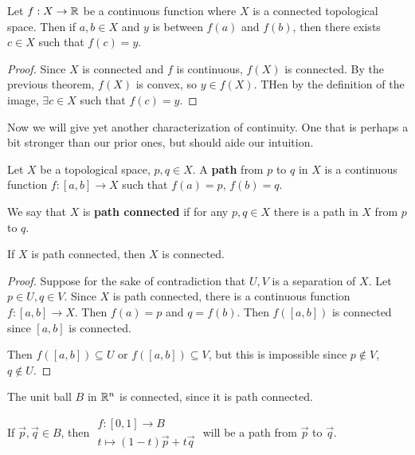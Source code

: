 \documentclass[12pt, twosided]{article}
\begin{document}
\begin{thm}
  Let \(f: X \to \mathbb{R}\) be a continuous function where \(X\) is a connected topological space. Then if \(a, b\in X\) and \(y\) is between \(f(a)\) and \(f(b)\), then there exists \(c \in X\) such that \(f(c) = y\). 
\end{thm}

\begin{proof}
  Since \(X\) is connected and \(f\) is continuous, \(f(X)\) is connected. By the previous theorem, \(f(X)\) is convex, so \(y \in f(X)\). THen by the definition of the image, \(\exists c \in X\) such that \(f(c) = y\).
\end{proof}

Now we will give yet another characterization of continuity. One that is perhaps a bit stronger than our prior ones, but should aide our intuition.

\begin{df}
  Let \(X\) be a topological space, \(p, q \in X\). A \textbf{path} from \(p\) to \(q\) in \(X\) is a continuous function \(f:[a,b] \to X\) such that \(f(a) = p\), \(f(b) = q\).

  We say that \(X\) is \textbf{path connected} if for any \(p,q\in X\) there is a path in \(X\) from \(p\) to \(q\).

  \begin{center}
  \end{center}
\end{df}


\begin{prop}
  If \(X\) is path connected, then \(X\) is connected.
\end{prop}

\begin{proof}
  Suppose for the sake of contradiction that \(U, V\) is a separation of \(X\). Let \(p \in U, q \in V\). Since \(X\) is path connected, there is a continuous function \(f:[a,b] \to X\). Then \(f(a) = p\) and \(q = f(b)\). Then \(f([a,b])\) is connected since \([a,b]\) is connected.

  Then \(f([a,b]) \subseteq U\) or \(f([a,b])\subseteq V\), but this is impossible since \(p\not\in V\), \(q \not\in U\).
\end{proof}

\begin{exa}
  The unit ball \(B\) in \(\mathbb{R}^n\) is connected, since it is path connected.

  If \(\vec{p},\vec{q} \in B\), then \(
  \begin{matrix}
    f:[0,1] \to B \\ t \mapsto (1-t)\vec{p} + t\vec{q}
  \end{matrix}\) will be a path from \(\vec{p}\) to \(\vec{q}\).
\end{exa}
\end{document}
